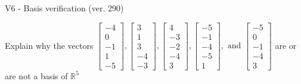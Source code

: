 \begin{exercise}
  \begin{exerciseTitle}V6 - Basis verification (ver. 290)\end{exerciseTitle}
  \begin{exerciseStatement}
    Explain why the vectors \(\left[\begin{array}{r}
-4 \\
0 \\
-1 \\
1 \\
-5
\end{array}\right] , \left[\begin{array}{r}
3 \\
1 \\
3 \\
-4 \\
-3
\end{array}\right] , \left[\begin{array}{r}
4 \\
-3 \\
-2 \\
-4 \\
3
\end{array}\right] , \left[\begin{array}{r}
-5 \\
-1 \\
-4 \\
-5 \\
1
\end{array}\right] , \text{ and } \left[\begin{array}{r}
-5 \\
0 \\
-1 \\
-4 \\
3
\end{array}\right]\) are or are not a basis of \(\mathbb{R}^5\)	



\end{exerciseStatement}
\end{exercise}
